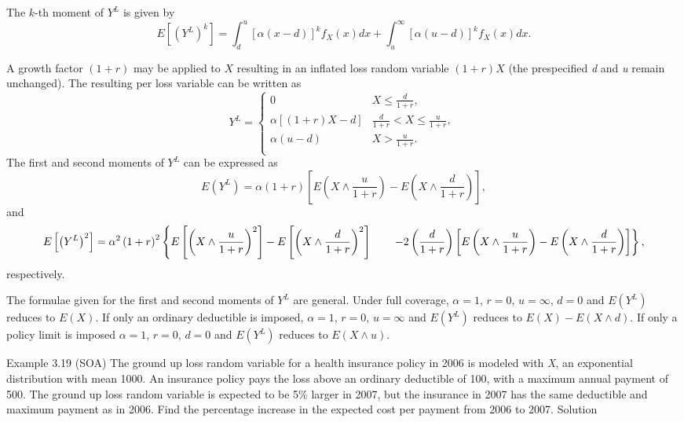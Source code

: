 \documentclass[]{book}
\begin{document}
The \(k\)-th moment of \(Y^{L}\) is given by
\[E\left\lbrack \left( Y^{L} \right)^{k} \right\rbrack = \int_{d}^{u}\left\lbrack \alpha\left( x - d \right) \right\rbrack^{k}f_{X}\left( x \right)dx + \int_{u}^{\infty}\left\lbrack \alpha\left( u - d \right) \right\rbrack^{k}f_{X}\left( x \right) dx .\]

A growth factor \(\left( 1 + r \right)\) may be applied to \(X\)
resulting in an inflated loss random variable \(\left( 1 + r \right)X\)
(the prespecified \emph{d} and \emph{u} remain unchanged). The resulting
per loss variable can be written as \[Y^{L} = \left\{ \begin{matrix}
0 & X \leq \frac{d}{1 + r}, \\
\alpha\left\lbrack \left( 1 + r \right)X - d \right\rbrack & \frac{d}{1 + r} <  X \leq \frac{u}{1 + r}, \\
\alpha\left( u - d \right) & X > \frac{u}{1 + r}. \\
\end{matrix} \right.\ \] The first and second moments of \(Y^{L}\) can
be expressed as
\[E\left( Y^{L} \right) = \alpha\left( 1 + r \right)\left\lbrack E\left( X \land \frac{u}{1 + r} \right) - E\left( X \land \frac{d}{1 + r} \right) \right\rbrack,\]
and \[E\left\lbrack \left( Y^{L} \right)^{2} 
\right\rbrack = \alpha^{2}\left( 1 + r \right)^{2}  \left\{ E\left\lbrack \left( X \land \frac{u}{1 + r} \right)^{2} \right\rbrack - E\left\lbrack \left( X \land \frac{d}{1 + r} \right)^{2} \right\rbrack  \right. \\
\left. \ \ \ \ \ - 2\left( \frac{d}{1 + r} \right)\left\lbrack E\left( X \land \frac{u}{1 + r} \right) - E\left( X \land \frac{d}{1 + r} \right) \right\rbrack \right\} ,\]
respectively.

The formulae given for the first and second moments of \(Y^{L}\) are
general. Under full coverage, \(\alpha = 1\), \(r = 0\), \(u = \infty\),
\(d = 0\) and \(E\left( Y^{L} \right)\) reduces to
\(E\left( X \right)\). If only an ordinary deductible is imposed,
\(\alpha = 1\), \(r = 0\), \(u = \infty\) and \(E\left( Y^{L} \right)\)
reduces to \(E\left( X \right) - E\left( X \land d \right)\). If only a
policy limit is imposed \(\alpha = 1\), \(r = 0\), \(d = 0\) and
\(E\left( Y^{L} \right)\) reduces to \(E\left( X \land u \right)\).

Example 3.19 (SOA) The ground up loss random variable for a health
insurance policy in 2006 is modeled with \emph{X}, an exponential
distribution with mean 1000. An insurance policy pays the loss above an
ordinary deductible of 100, with a maximum annual payment of 500. The
ground up loss random variable is expected to be 5\% larger in 2007, but
the insurance in 2007 has the same deductible and maximum payment as in
2006. Find the percentage increase in the expected cost per payment from
2006 to 2007. Solution
\end{document}
